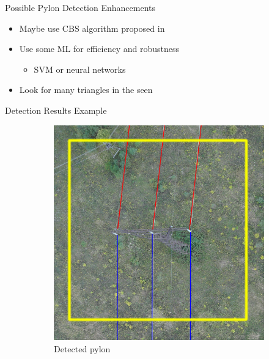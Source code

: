 \documentclass{beamer}
\begin{document}
\begin{frame}[t, fragile]{Possible Pylon Detection Enhancements}
\begin{itemize}
\item Maybe use CBS algorithm proposed in \rbrack
\item Use some ML for efficiency and robustness
\begin{itemize} 
\item SVM or neural networks
\end{itemize}
\item Look for many triangles in the seen
\end{itemize}
\end{frame}


\begin{frame}[t, fragile]{Detection Results Example}
\begin{figure}
\centering
\begin{subfigure}{.5\textwidth}
\centering
\includegraphics[scale=0.07]{intersection1}
\caption{Detected pylon}
\end{subfigure}%
\begin{subfigure}{.5\textwidth}
\centering

\end{subfigure}
\end{figure}
\end{frame}
\end{document}
